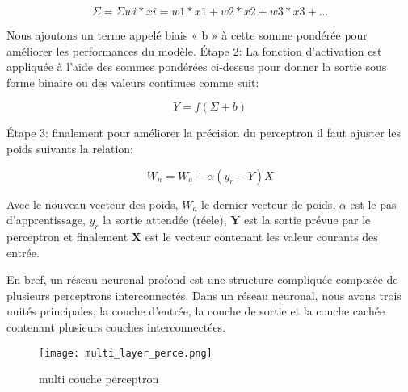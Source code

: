             \begin{equation}\label{eq:per_sum}
                \Sigma = \Sigma wi*xi = w1*x1 + w2*x2 + w3*x3 + \dots
            \end{equation}


            Nous ajoutons un terme appelé biais « b » à cette somme pondérée pour améliorer les performances du modèle. 
            Étape 2: La fonction d'activation est appliquée à l'aide des sommes pondérées ci-dessus pour donner la sortie sous forme binaire ou des valeurs continues comme suit:


            \begin{equation}\label{eq:per_func}
                Y = f(\Sigma + b)
            \end{equation}

            Étape 3: finalement pour améliorer la précision du perceptron il faut ajuster les poids suivants la relation:

            \begin{equation}\label{eq:per_weights}
                W_n = W_a + \alpha (y_r - Y) X
            \end{equation}
            

            Avec  le nouveau vecteur des poids, \textbf{\(W_a\)} le dernier vecteur de poids, \textbf{\(\alpha\)} est le pas d'apprentissage, \textbf{\(y_r\)} la sortie attendée (réele), \textbf{Y} est la sortie prévue par le perceptron et finalement \textbf{X} est le vecteur contenant les valeur courants des entrée.

        En bref, un réseau neuronal profond est une structure compliquée composée de plusieurs perceptrons interconnectés. Dans un réseau neuronal, nous avons trois unités principales, la couche d'entrée, la couche de sortie et la couche cachée contenant plusieurs couches interconnectées.
        
        \begin{figure}[H] 
            \centering
            \texttt{[image: multi\_layer\_perce.png]}
            \caption{multi couche perceptron}
            \label{fig:m_l_p}
        \end{figure}

